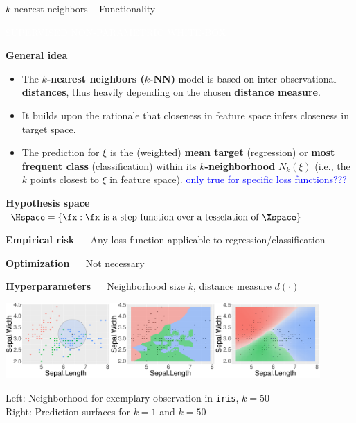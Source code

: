 \documentclass[11pt,compress,t,notes=noshow, xcolor=table]{beamer}
\newcommand{\maketag}[1]{\colorbox{highlightcol}{\textcolor{white}
{\MakeUppercase{#1}}}}
\newcommand{\highlight}[1]{\textcolor{highlightcol}{\textbf{#1}}}
\let\code=\texttt
\begin{document}
\begin{frame}{$k$-nearest neighbors -- Functionality}

\footnotesize

\maketag{Supervised}
\maketag{Non-parametric}
\maketag{White-box}

\medskip

\highlight{General idea}
\begin{itemize}
  \item The \textbf{$k$-nearest neighbors ($k$-NN)} model is based on 
  inter-observational \textbf{distances}, thus heavily depending on the chosen 
  \textbf{distance measure}.
  \item It builds upon the rationale that closeness in feature space infers
  closeness in target space.
  \item The prediction for $\xi$ is the (weighted) \textbf{mean target} 
  (regression) or \textbf{most frequent class} (classification) within 
  its \textbf{$k$-neighborhood} $N_k(\xi)$ (i.e., the $k$ points closest to $\xi$ in
  feature space). \textcolor{blue}{only true for specific loss
  functions???}
\end{itemize}

\medskip
 
\highlight{Hypothesis space} ~~ $\Hspace = \left\{ \fx: \fx \text{ is a step 
function over a tesselation of } \Xspace \right\}$

\medskip

\highlight{Empirical risk} ~~ Any loss function applicable to 
regression/classification

\highlight{Optimization} ~~ Not necessary

\highlight{Hyperparameters} ~~ Neighborhood size $k$, distance measure 
$d(\cdot)$

\medskip

\begin{minipage}{0.8\textwidth}
  \includegraphics[width=0.9\textwidth]{figure/knn-neighborhood.pdf}
\end{minipage}%
\begin{minipage}{0.2\textwidth}
  \tiny
  \raggedright
  Left: Neighborhood for exemplary observation in \code{iris}, $k = 50$ \\
  Right: Prediction surfaces for $k = 1$ and $k = 50$
\end{minipage}
\end{frame}
\end{document}
